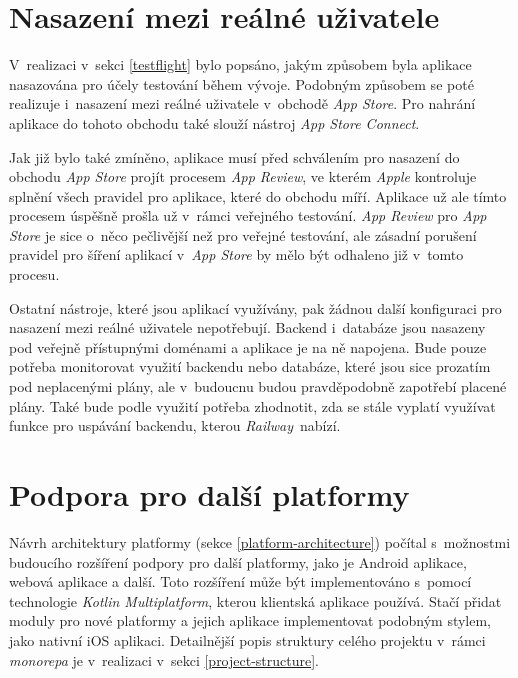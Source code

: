 \section{Nasazení mezi reálné uživatele}

V~realizaci v~sekci \ref{testflight} bylo popsáno, jakým způsobem byla aplikace nasazována pro účely testování během vývoje. Podobným způsobem se poté realizuje i~nasazení mezi reálné uživatele v~obchodě \emph{App Store}. Pro nahrání aplikace do tohoto obchodu také slouží nástroj \emph{App Store Connect}.

Jak již bylo také zmíněno, aplikace musí před schválením pro nasazení do obchodu \emph{App Store} projít procesem \emph{App Review}, ve kterém \emph{Apple} kontroluje splnění všech pravidel pro aplikace, které do obchodu míří. Aplikace už ale tímto procesem úspěšně prošla už v~rámci veřejného testování. \emph{App Review} pro \emph{App Store} je sice o~něco pečlivější než pro veřejné testování, ale zásadní porušení pravidel pro šíření aplikací v~\emph{App Store} by mělo být odhaleno již v~tomto procesu.

Ostatní nástroje, které jsou aplikací využívány, pak žádnou další konfiguraci pro nasazení mezi reálné uživatele nepotřebují. Backend i~databáze jsou nasazeny pod veřejně přístupnými doménami a aplikace je na ně napojena. Bude pouze potřeba monitorovat využití backendu nebo databáze, které jsou sice prozatím pod neplacenými plány, ale v~budoucnu budou pravděpodobně zapotřebí placené plány. Také bude podle využití potřeba zhodnotit, zda se stále vyplatí využívat funkce pro uspávání backendu, kterou \emph{Railway} nabízí.

\section{Podpora pro další platformy}

Návrh architektury platformy (sekce \ref{platform-architecture}) počítal s~možnostmi budoucího rozšíření podpory pro další platformy, jako je Android aplikace, webová aplikace a další. Toto rozšíření může být implementováno s~pomocí technologie \emph{Kotlin Multiplatform}, kterou klientská aplikace používá. Stačí přidat moduly pro nové platformy a jejich aplikace implementovat podobným stylem, jako nativní iOS aplikaci. Detailnější popis struktury celého projektu v~rámci \emph{monorepa} je v~realizaci v~sekci \ref{project-structure}.

